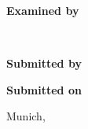 \vspace*{4.3mm}
\textbf{Examined by}\tab
\begin{minipage}[t]{\textwidth-\CurrentLineWidth}
\ExaminedBy\\
\SupervisingChair\strut
\end{minipage}

\vspace*{4.3mm}
\textbf{Submitted by}\tab
\begin{minipage}[t]{\textwidth-\CurrentLineWidth}
\SubmittedBy
\end{minipage}

\vspace*{-1mm}
\textbf{Submitted on}\tab 
\begin{minipage}[t]{\textwidth-\CurrentLineWidth}
Munich, \SubmittedOn\strut
\end{minipage}

